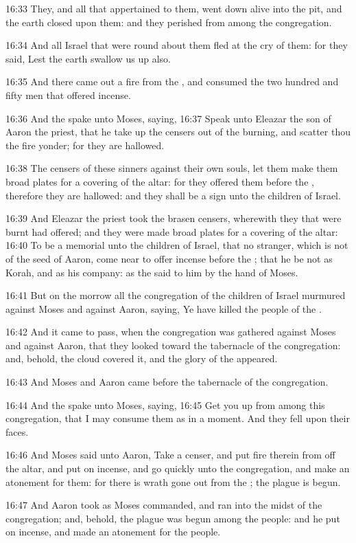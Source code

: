 16:33 They, and all that appertained to them, went down alive into the
pit, and the earth closed upon them: and they perished from among the
congregation.

16:34 And all Israel that were round about them fled at the cry of
them: for they said, Lest the earth swallow us up also.

16:35 And there came out a fire from the \LORD, and consumed the two
hundred and fifty men that offered incense.

16:36 And the \LORD spake unto Moses, saying, 16:37 Speak unto Eleazar
the son of Aaron the priest, that he take up the censers out of the
burning, and scatter thou the fire yonder; for they are hallowed.

16:38 The censers of these sinners against their own souls, let them
make them broad plates for a covering of the altar: for they offered
them before the \LORD, therefore they are hallowed: and they shall be a
sign unto the children of Israel.

16:39 And Eleazar the priest took the brasen censers, wherewith they
that were burnt had offered; and they were made broad plates for a
covering of the altar: 16:40 To be a memorial unto the children of
Israel, that no stranger, which is not of the seed of Aaron, come near
to offer incense before the \LORD; that he be not as Korah, and as his
company: as the \LORD said to him by the hand of Moses.

16:41 But on the morrow all the congregation of the children of Israel
murmured against Moses and against Aaron, saying, Ye have killed the
people of the \LORD.

16:42 And it came to pass, when the congregation was gathered against
Moses and against Aaron, that they looked toward the tabernacle of the
congregation: and, behold, the cloud covered it, and the glory of the
\LORD appeared.

16:43 And Moses and Aaron came before the tabernacle of the
congregation.

16:44 And the \LORD spake unto Moses, saying, 16:45 Get you up from
among this congregation, that I may consume them as in a moment. And
they fell upon their faces.

16:46 And Moses said unto Aaron, Take a censer, and put fire therein
from off the altar, and put on incense, and go quickly unto the
congregation, and make an atonement for them: for there is wrath gone
out from the \LORD; the plague is begun.

16:47 And Aaron took as Moses commanded, and ran into the midst of the
congregation; and, behold, the plague was begun among the people: and
he put on incense, and made an atonement for the people.


